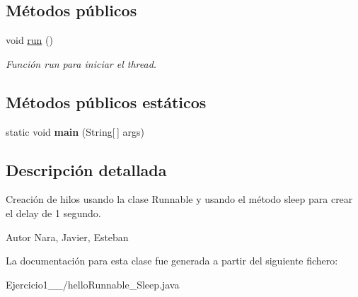 \subsection*{Métodos públicos}
\begin{DoxyCompactItemize}
\item 
\hypertarget{class_ejercicio1__1__3_1_1hello_runnable___sleep_a6c927c4f6335ff596aeec32b5e746bd8}{}void \hyperlink{class_ejercicio1__1__3_1_1hello_runnable___sleep_a6c927c4f6335ff596aeec32b5e746bd8}{run} ()\label{class_ejercicio1__1__3_1_1hello_runnable___sleep_a6c927c4f6335ff596aeec32b5e746bd8}

\begin{DoxyCompactList}\small\item\em Función run para iniciar el thread. \end{DoxyCompactList}\end{DoxyCompactItemize}
\subsection*{Métodos públicos estáticos}
\begin{DoxyCompactItemize}
\item 
\hypertarget{class_ejercicio1__1__3_1_1hello_runnable___sleep_ac0e52a6a4f12fbede032f7b8a1224e6e}{}static void {\bfseries main} (String\mbox{[}$\,$\mbox{]} args)\label{class_ejercicio1__1__3_1_1hello_runnable___sleep_ac0e52a6a4f12fbede032f7b8a1224e6e}

\end{DoxyCompactItemize}


\subsection{Descripción detallada}
Creación de hilos usando la clase Runnable y usando el método sleep para crear el delay de 1 segundo. 

\begin{DoxyAuthor}{Autor}
Nara, Javier, Esteban 
\end{DoxyAuthor}


La documentación para esta clase fue generada a partir del siguiente fichero\+:\begin{DoxyCompactItemize}
\item 
Ejercicio1\+\_\+\_/hello\+Runnable\+\_\+\+Sleep.\+java\end{DoxyCompactItemize}

